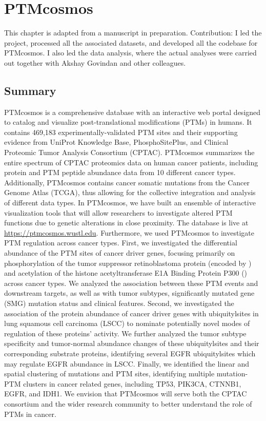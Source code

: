 \chapter{PTMcosmos}
\label{chap:ptmcosmos}

This chapter is adapted from a manuscript in preparation. Contribution: I led the project, processed all the associated datasets, and developed all the codebase for PTMcosmos. I also led the data analysis, where the actual analyses were carried out together with Akshay Govindan and other colleagues.



\section{Summary}
PTMcosmos is a comprehensive database with an interactive web portal designed to catalog and visualize post-translational modifications (PTMs) in humans. It contains 469,183 experimentally-validated PTM sites and their supporting evidence from UniProt Knowledge Base, PhosphoSitePlus, and Clinical Proteomic Tumor Analysis Consortium (CPTAC). PTMcosmos summarizes the entire spectrum of CPTAC proteomics data on human cancer patients, including protein and PTM peptide abundance data from 10 different cancer types. Additionally, PTMcosmos contains cancer somatic mutations from the Cancer Genome Atlas (TCGA), thus allowing for the collective integration and analysis of different data types.  In PTMcosmos, we have built an ensemble of interactive visualization tools that will allow researchers to investigate altered PTM functions due to genetic alterations in close proximity. The database is live at \url{https://ptmcosmos.wustl.edu}. Furthermore, we used PTMcosmos to investigate PTM regulation across cancer types. First, we investigated the differential abundance of the PTM sites of cancer driver genes, focusing primarily on phosphorylation of the tumor suppressor retinoblastoma protein (encoded by )  and acetylation of the histone acetyltransferase E1A Binding Protein P300 () across cancer types. We analyzed the association between these PTM events and downstream targets, as well as with tumor subtypes, significantly mutated gene (SMG) mutation status  and clinical features. Second, we investigated the association of the protein abundance of cancer driver genes with ubiquitylsites in lung squamous cell carcinoma (LSCC) to nominate potentially novel modes of regulation of these proteins’ activity. We further analyzed the tumor subtype specificity and tumor-normal abundance changes of these ubiquitylsites and their corresponding substrate proteins, identifying several EGFR ubiquitylsites which may regulate EGFR abundance in LSCC. Finally, we identified the linear and spatial clustering of mutations and PTM sites, identifying multiple mutation-PTM clusters in cancer related genes, including TP53, PIK3CA, CTNNB1, EGFR, and IDH1. We envision that PTMcosmos will serve both the CPTAC consortium and the wider research community to better understand the role of PTMs in cancer.


